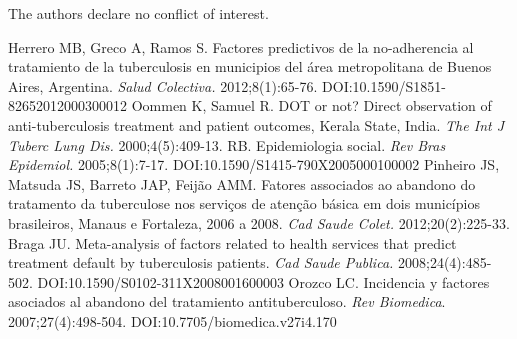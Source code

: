 \begin{multicols}{2}
\medskip\par\noindent
{}The authors declare no conflict of interest.\allowbreak{}
\begin{biblio}[REFERENCES]
\allowbreak{} Herrero MB,\allowbreak{} Greco A,\allowbreak{} Ramos S.\allowbreak{} Factores predictivos de la no-\allowbreak{}adherencia al tratamiento de la tuberculosis en municipios del área metropolitana de Buenos Aires,\allowbreak{} Argentina.\allowbreak{} \textit{Salud Colectiva.\allowbreak{} }2012;8(\allowbreak{}1)\allowbreak{}:\allowbreak{}65-\allowbreak{}76.\allowbreak{} DOI:\allowbreak{}10.\allowbreak{}1590\fshyp{}S1851-\allowbreak{}82652012000300012
\allowbreak{} Oommen K,\allowbreak{} Samuel R.\allowbreak{} DOT or not? Direct observation of anti-\allowbreak{}tuberculosis treatment and patient outcomes,\allowbreak{} Kerala State,\allowbreak{} India.\allowbreak{} \textit{The Int J Tuberc Lung Dis.\allowbreak{}} 2000;4(\allowbreak{}5)\allowbreak{}:\allowbreak{}409-\allowbreak{}13.\allowbreak{}
RB.\allowbreak{} Epidemiologia social.\allowbreak{} \textit{Rev Bras Epidemiol.\allowbreak{} }2005;8(\allowbreak{}1)\allowbreak{}:\allowbreak{}7-\allowbreak{}17.\allowbreak{} DOI:\allowbreak{}10.\allowbreak{}1590\fshyp{}S1415-\allowbreak{}790X2005000100002
\allowbreak{} Pinheiro JS,\allowbreak{} Matsuda JS,\allowbreak{} Barreto JAP,\allowbreak{} Feijão AMM.\allowbreak{} Fatores associados ao abandono do tratamento da tuberculose nos serviços de atenção básica em dois municípios brasileiros,\allowbreak{} Manaus e Fortaleza,\allowbreak{} 2006 a 2008.\allowbreak{} \textit{Cad Saude Colet.\allowbreak{}} 2012;20(\allowbreak{}2)\allowbreak{}:\allowbreak{}225-\allowbreak{}33.\allowbreak{}
\allowbreak{} Braga JU.\allowbreak{} Meta-\allowbreak{}analysis of factors related to health services that predict treatment default by tuberculosis patients.\allowbreak{} \textit{Cad Saude Publica.\allowbreak{}} 2008;24(\allowbreak{}4)\allowbreak{}:\allowbreak{}485-\allowbreak{}502.\allowbreak{} DOI:\allowbreak{}10.\allowbreak{}1590\fshyp{}S0102-\allowbreak{}311X2008001600003
\allowbreak{} Orozco LC.\allowbreak{} Incidencia y factores asociados al abandono del tratamiento antituberculoso.\allowbreak{} \textit{Rev Biomedica}.\allowbreak{} 2007;27(\allowbreak{}4)\allowbreak{}:\allowbreak{}498-\allowbreak{}504.\allowbreak{} DOI:\allowbreak{}10.\allowbreak{}7705\fshyp{}biomedica.\allowbreak{}v27i4.\allowbreak{}170

\end{biblio}
\end{multicols}
